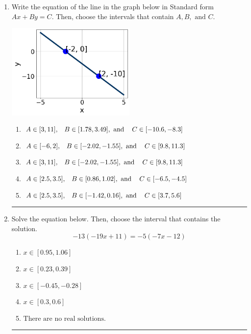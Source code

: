 \documentclass[14pt]{extbook}
\newcommand{\litem}[1]{\item#1\hspace*{-1cm}\rule{\textwidth}{0.4pt}}
\begin{document}
\begin{enumerate}
{\begin{enumerate}[label=\Alph*.]
\end{enumerate} }
\litem{
Write the equation of the line in the graph below in Standard form $Ax+By=C$. Then, choose the intervals that contain $A, B, \text{ and } C$.
\begin{center}
    \includegraphics[width=0.5\textwidth]{../Figures/linearGraphToStandardC.png}
\end{center}
\begin{enumerate}[label=\Alph*.]
\item \( A \in [3, 11], \hspace{3mm} B \in [1.78, 3.49], \text{ and } \hspace{3mm} C \in [-10.6, -8.3] \)
\item \( A \in [-6, 2], \hspace{3mm} B \in [-2.02, -1.55], \text{ and } \hspace{3mm} C \in [9.8, 11.3] \)
\item \( A \in [3, 11], \hspace{3mm} B \in [-2.02, -1.55], \text{ and } \hspace{3mm} C \in [9.8, 11.3] \)
\item \( A \in [2.5, 3.5], \hspace{3mm} B \in [0.86, 1.02], \text{ and } \hspace{3mm} C \in [-6.5, -4.5] \)
\item \( A \in [2.5, 3.5], \hspace{3mm} B \in [-1.42, 0.16], \text{ and } \hspace{3mm} C \in [3.7, 5.6] \)

\end{enumerate} }
\litem{
Solve the equation below. Then, choose the interval that contains the solution.\[ -13(-19x + 11) = -5(-7x -12) \]\begin{enumerate}[label=\Alph*.]
\item \( x \in [0.95, 1.06] \)
\item \( x \in [0.23, 0.39] \)
\item \( x \in [-0.45, -0.28] \)
\item \( x \in [0.3, 0.6] \)
\item \( \text{There are no real solutions.} \)

\end{enumerate} }
\end{enumerate}
\end{document}
